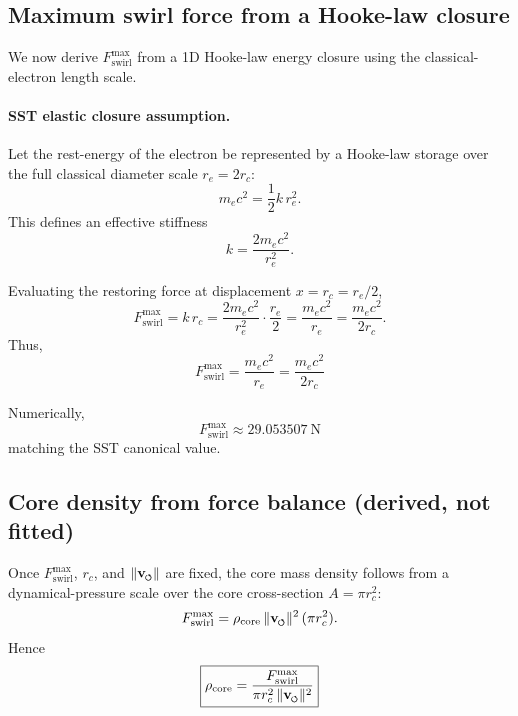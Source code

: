 \documentclass[11pt]{article}
\newcommand{\vswirl}{\mathbf{v}_{\mkern-2mu\scriptscriptstyle\boldsymbol{\circlearrowleft}}}
\newcommand{\rc}{r_c}                                    %
\begin{document}
    \subsection{Maximum swirl force from a Hooke-law closure}
    We now derive \(F_{\text{swirl}}^{\max}\) from a 1D Hooke-law energy closure using the classical-electron length scale.

    \paragraph{SST elastic closure assumption.}
        Let the rest-energy of the electron be represented by a Hooke-law storage over the full classical diameter scale \(r_e=2\rc\):
        \begin{equation}
            m_e c^2 = \frac{1}{2}k\,r_e^2.
            \label{eq:hooke-rest-energy}
        \end{equation}
        This defines an effective stiffness
        \begin{equation}
            k = \frac{2m_e c^2}{r_e^2}.
            \label{eq:k-effective}
        \end{equation}

        Evaluating the restoring force at displacement \(x=\rc=r_e/2\),
        \begin{equation}
            F_{\text{swirl}}^{\max} = k\,\rc
            = \frac{2m_e c^2}{r_e^2}\cdot \frac{r_e}{2}
            = \frac{m_e c^2}{r_e}
            = \frac{m_e c^2}{2\rc}.
            \label{eq:Fswirlmax-from-hooke}
        \end{equation}
        Thus,
        \begin{equation}
            \boxed{
                F_{\text{swirl}}^{\max}=\frac{m_e c^2}{r_e}=\frac{m_e c^2}{2\rc}
            }
        \end{equation}

        Numerically,
        \[
            \boxed{
                F_{\text{swirl}}^{\max}\approx 29.053507\ \mathrm{N}
            }
        \]
        matching the SST canonical value.

    \subsection{Core density from force balance (derived, not fitted)}
    Once \(F_{\text{swirl}}^{\max}\), \(\rc\), and \(\lVert\vswirl\rVert\) are fixed, the core mass density follows from a dynamical-pressure scale over the core cross-section \(A=\pi \rc^2\):
    \begin{equation}
        F_{\text{swirl}}^{\max} = \rho_{\text{core}}\,\lVert \vswirl\rVert^2\,(\pi \rc^2).
        \label{eq:F-dyn-pressure-core}
    \end{equation}
    Hence
    \begin{equation}
        \boxed{
            \rho_{\text{core}}=\frac{F_{\text{swirl}}^{\max}}{\pi \rc^2\,\lVert\vswirl\rVert^2}
        }
        \label{eq:rho-core-derived}
    \end{equation}
\end{document}
